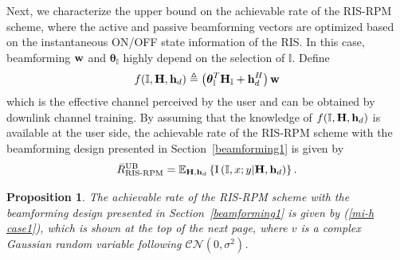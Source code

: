 \documentclass[draftclsnofoot,onecolumn,12pt]{IEEEtran}
\newtheorem{proposition}[theorem]{Proposition}
\begin{document}
Next, we characterize the upper bound on the achievable rate of the RIS-RPM scheme, where the active and passive beamforming vectors are optimized based on the instantaneous ON/OFF state information of the RIS.
In this case, beamforming ${\bf w}$ and ${\bm \theta}_{\mathbb I}$ highly depend on the selection of ${\mathbb I}$. 
Define 
\begin{align}\label{overall channel}
f({\mathbb{I}},{\bf H},{\bf h}_d) \triangleq\left( {\bm \theta}_{\mathbb I}^T {\bf H}_{\mathbb I} + {\bf h}_d^H\right) {\bf w}
\end{align}
which is the effective channel perceived by the user and can be obtained by downlink channel training. 
By assuming that the knowledge of $f({\mathbb{I}},{\bf H},{\bf h}_d) $ is available at the user side, the achievable rate of the  RIS-RPM scheme with the beamforming design presented in Section~\ref{beamforming1} is given by 
\begin{align}\label{dif-mi case1}
\bar{R}_\text{RIS-RPM}^\text{UB}=\mathbb{E}_{{\bf H},{\bf h}_d}\left\{\text{I}\left(\mathbb{I},x;y|{\bf H},{\bf h}_d\right)\right\}.
\end{align}

\begin{proposition}
The achievable rate of the  RIS-RPM scheme with the beamforming design presented  in Section~\ref{beamforming1} is given by (\ref{mi-h case1}), which is shown at the top of the next page, where $v$ is a complex Gaussian random variable following $\mathcal{CN}( { 0},\sigma^2)$. 

\end{proposition}
\end{document}
